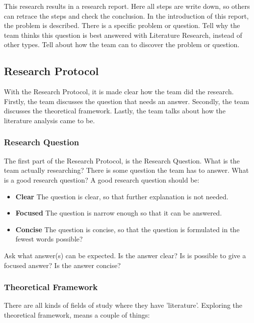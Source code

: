 \documentclass[10pt]{report}
\begin{document}
This research results in a research report. Here all steps are write down, so others can retrace the steps and check the conclusion. In the introduction of this report, the problem is described. There is a specific problem or question. Tell why the team thinks this question is best answered with Literature Research, instead of other types. Tell about how the team can to discover the problem or question.

\subsection{Research Protocol}

With the Research Protocol, it is made clear how the team did the research. Firstly, the team discusses the question that needs an answer. Secondly, the team discusses the theoretical framework. Lastly, the team talks about how the literature analysis came to be.

\subsubsection{Research Question}

The first part of the Research Protocol, is the Research Question. What is the team actually researching? There is some question the team has to answer. What is a good research question? A good research question should be:

\begin{itemize}
	\item \textbf{Clear} The question is clear, so that further explanation is not needed.
	\item \textbf{Focused} The question is narrow enough so that it can be answered.
	\item \textbf{Concise} The question is concise, so that the question is formulated in the fewest words possible?
\end{itemize}

Ask what answer(s) can be expected. Is the answer clear? Is is possible to give a focused answer? Is the answer concise?

\subsubsection{Theoretical Framework}

There are all kinds of fields of study where they have 'literature'. Exploring the theoretical framework, means a couple of things:
\end{document}

